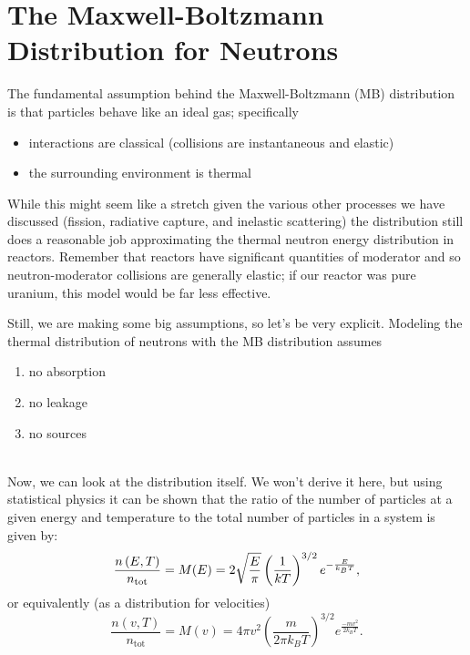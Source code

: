 \documentclass{report}
\begin{document}
\newpage
\section*{The Maxwell-Boltzmann Distribution for Neutrons} 

The fundamental assumption behind the Maxwell-Boltzmann (MB) distribution is that particles behave like an ideal gas; specifically
\begin{itemize}
\item interactions are classical (collisions are instantaneous and elastic)
\item the surrounding environment is thermal
\end{itemize}
While this might seem like a stretch given the various other processes we have discussed (fission, radiative capture, and inelastic scattering) the distribution still does a reasonable job approximating the thermal neutron energy distribution in reactors.
Remember that reactors have significant quantities of moderator and so neutron-moderator collisions are generally elastic; if our reactor was pure uranium, this model would be far less effective.

Still, we are making some big assumptions, so let's be very explicit.
Modeling the thermal distribution of neutrons with the MB distribution assumes
\begin{enumerate}
\item no absorption
\item no leakage
\item no sources
\end{enumerate}
\-\\
Now, we can look at the distribution itself.
We won't derive it here, but using statistical physics it can be shown that the ratio of the number of particles at a given energy and temperature to the total number of particles in a system is given by:
\begin{equation}
\setcounter{equation}{1}
\frac{n\left(E, T\right)}{n_{\text{tot}}} = M(E) = 2\sqrt{\frac{E}{\pi}}\left(\frac{1}{kT}\right)^{3/2} e^{-\frac{E}{k_B T}} ,
\label{mb-energy}
\end{equation}
or equivalently (as a distribution for velocities)
\begin{equation}
\frac{n\left(v, T\right)}{n_{\text{tot}}} = M(v) = 4 \pi v^2 \left(\frac{m}{2 \pi k_B T} \right)^{3/2} e^{\frac{-m v^2}{2 k_B T}} .
\label{mb-velocity}
\end{equation}
\end{document}
